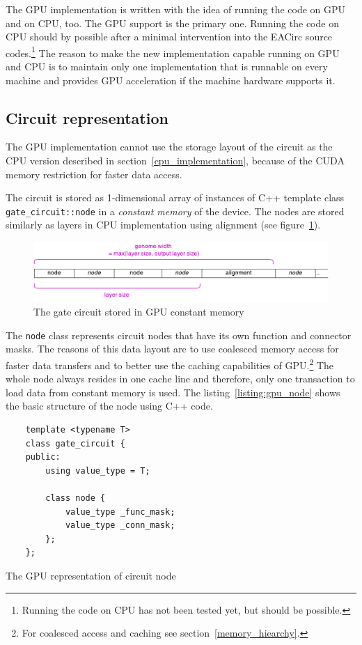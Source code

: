 \documentclass[12pt,oneside]{fithesis2}
\begin{document}
The GPU implementation is written with the idea of running the code on GPU and on CPU, too. The GPU support is the primary one. Running the code on CPU should by possible after a minimal intervention into the EACirc source codes.\footnote{Running the code on CPU has not been tested yet, but should be possible.} The reason to make the new implementation capable running on GPU and CPU is to maintain only one implementation that is runnable on every machine and provides GPU acceleration if the machine hardware supports it.

\subsection{Circuit representation}
\label{gpu_curcuit_repr}

The GPU implementation cannot use the storage layout of the circuit as the CPU version described in section~\ref{cpu_implementation}, because of the CUDA memory restriction for faster data access.

The circuit is stored as 1-dimensional array of instances of C++ template class \texttt{gate\_circuit::node} in a \emph{constant memory} of the device. The nodes are stored similarly as layers in CPU implementation using alignment (see figure~\ref{fig:gpu_genome}).

\begin{figure}[h]
	\centering
	\includegraphics[width=\textwidth]{figures/gpu_genome.pdf}
	\caption{The gate circuit stored in GPU constant memory}
	\label{fig:gpu_genome}
\end{figure}


The \texttt{node} class represents circuit nodes that have its own function and connector masks. The reasons of this data layout are to use coalesced memory access for faster data transfers and to better use the caching capabilities of GPU.\footnote{For coalesced access and caching see section~\ref{memory_hiearchy}.} The whole node always resides in one cache line and therefore, only one transaction to load data from constant memory is used. The listing~\ref{listing:gpu_node} shows the basic structure of the node using C++ code.

\begin{listing}[h]
	\begin{verbatim}
	template <typename T>
	class gate_circuit {
	public:
		using value_type = T;
		
		class node {
			value_type _func_mask;
			value_type _conn_mask;
		};	
	};
	\end{verbatim}
	\caption{The GPU representation of circuit node}
	\label{listing:gpu_node}
\end{listing}
\end{document}
